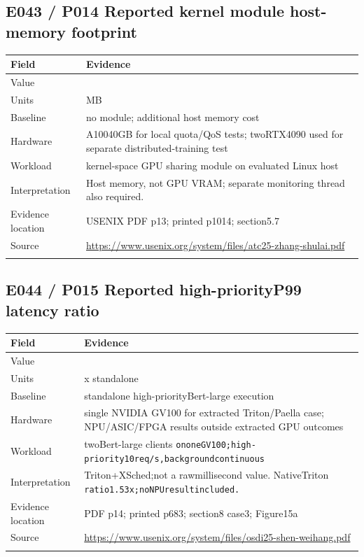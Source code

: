\subsection*{E043 / P014 Reported kernel module host-memory footprint}

\begin{longtable}{>{\raggedright\arraybackslash}p{}>{\raggedright\arraybackslash}p{}}
\toprule
\textbf{Field} & \textbf{Evidence}\\\midrule\endhead
Value & 4.8\\\addlinespace
Units & MB\\\addlinespace
Baseline & no module; additional host memory cost\\\addlinespace
Hardware & A10040GB for local quota/QoS tests; twoRTX4090 used for separate distributed-training test\\\addlinespace
Workload & kernel-space GPU sharing module on evaluated Linux host\\\addlinespace
Interpretation & Host memory, not GPU VRAM; separate monitoring thread also required.\\\addlinespace
Evidence location & USENIX PDF p13; printed p1014; section5.7\\\addlinespace
Source & \url{https://www.usenix.org/system/files/atc25-zhang-shulai.pdf}\\\addlinespace
\bottomrule\end{longtable}

\subsection*{E044 / P015 Reported high-priorityP99 latency ratio}

\begin{longtable}{>{\raggedright\arraybackslash}p{}>{\raggedright\arraybackslash}p{}}
\toprule
\textbf{Field} & \textbf{Evidence}\\\midrule\endhead
Value & 1.07\\\addlinespace
Units & x standalone\\\addlinespace
Baseline & standalone high-priorityBert-large execution\\\addlinespace
Hardware & single NVIDIA GV100 for extracted Triton/Paella case; NPU/ASIC/FPGA results outside extracted GPU outcomes\\\addlinespace
Workload & twoBert-large clients \nolinkurl{ononeGV100;high-priority10req/s,backgroundcontinuous}\\\addlinespace
Interpretation & Triton+XSched;not a rawmillisecond value. NativeTriton \nolinkurl{ratio1.53x;noNPUresultincluded.}\\\addlinespace
Evidence location & PDF p14; printed p683; section8 case3; Figure15a\\\addlinespace
Source & \url{https://www.usenix.org/system/files/osdi25-shen-weihang.pdf}\\\addlinespace
\bottomrule\end{longtable}

